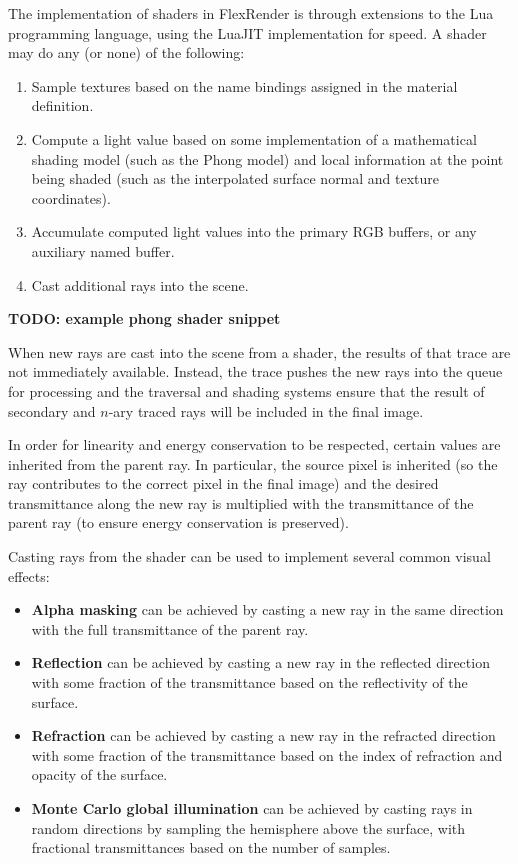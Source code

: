 \documentclass[12pt]{ucthesis}
\begin{document}
The implementation of shaders in FlexRender is through extensions to the Lua
\cite{lua} programming language, using the LuaJIT \cite{luajit} implementation
for speed. A shader may do any (or none) of the following:

\begin{enumerate}
    \item Sample textures based on the name bindings assigned in the material
        definition.
    \item Compute a light value based on some implementation of a mathematical
        shading model (such as the Phong model) and local information at the
        point being shaded (such as the interpolated surface normal and texture
        coordinates).
    \item Accumulate computed light values into the primary RGB buffers, or
        any auxiliary named buffer.
    \item Cast additional rays into the scene.
\end{enumerate}

\textbf{TODO: example phong shader snippet}

When new rays are cast into the scene from a shader, the results of that trace
are not immediately available. Instead, the trace pushes the new rays into the
queue for processing and the traversal and shading systems ensure that the
result of secondary and $n$-ary traced rays will be included in the final image.

In order for linearity and energy conservation to be respected, certain values
are inherited from the parent ray. In particular, the source pixel is inherited
(so the ray contributes to the correct pixel in the final image) and the
desired transmittance along the new ray is multiplied with the transmittance of
the parent ray (to ensure energy conservation is preserved).

Casting rays from the shader can be used to implement several common visual
effects:

\begin{itemize}
    \item \textbf{Alpha masking} can be achieved by casting a new ray in the
        same direction with the full transmittance of the parent ray.
    \item \textbf{Reflection} can be achieved by casting a new ray in the
        reflected direction with some fraction of the transmittance based on
        the reflectivity of the surface.
    \item \textbf{Refraction} can be achieved by casting a new ray in the
        refracted direction with some fraction of the transmittance based on
        the index of refraction and opacity of the surface.
    \item \textbf{Monte Carlo global illumination} can be achieved by casting
        rays in random directions by sampling the hemisphere above the surface,
        with fractional transmittances based on the number of samples.
\end{itemize}
\end{document}
